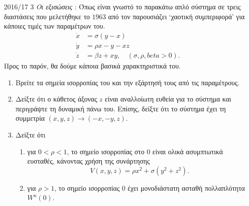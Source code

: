 \begin{exercise}{2016/17 3}
    \emph{Οι εξισώσεις }: Όπως είναι γνωστό το παρακάτω απλό σύστημα
    σε τρεις διαστάσεις που μελετήθηκε το \( 1963 \) από τον 
    παρουσιάζει \enquote*{χαοτική συμπεριφορά} για κάποιες τιμές των παραμέτρων
    του.
    \begin{align*}
        \dot{x} &= \sigma(y - x) \\
        \dot{y} &= \rho x - y - xz \\
        \dot{z} &= \beta z + xy, \quad ( \sigma, \rho, beta > 0).
    \end{align*}
    Προς το παρόν, θα δούμε κάποια βασικά χαρακτηριστικά του.
    \begin{enumerate}[label= (\alph*)]
        \item Βρείτε τα σημεία ισορροπίας του και την εξάρτησή τους από τις
            παραμέτρους.
        \item Δείξτε ότι ο κάθετος άξονας \( z \) είναι αναλλοίωτη ευθεία για το
            σύστημα και περιγράψτε τη δυναμική πάνω του. Επίσης, δείξτε ότι το
            σύστημα έχει τη συμμετρία \( (x, y, z) \to (-x, -y, z) \).
        \item Δείξτε ότι
            \begin{enumerate}[label= (\roman*)]
                \item για \( 0 < \rho < 1 \), το σημείο ισορροπίας στο \( 0 \)
                    είναι ολικά ασυμπτωτικά ευσταθές, κάνοντας χρήση της
                    συνάρτησης 
                    \begin{equation*}
                        V(x, y, z) = \rho x^2 + \sigma(y^2 + z^2).
                    \end{equation*}
                \item για \( \rho > 1 \), το σημείο ισορροπίας \( 0 \) έχει
                    μονοδιάστατη ασταθή πολλαπλότητα \( W^u(0) \).
            \end{enumerate}
    \end{enumerate}
\end{exercise}
